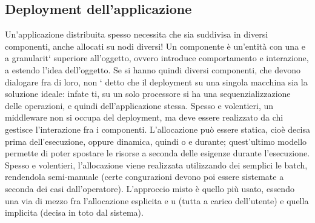 \subsection{Deployment dell'applicazione}

Un'applicazione distribuita spesso necessita che sia suddivisa in diversi componenti, anche allocati su nodi diversi! Un
componente è un'entità con una
e
a
granularit` superiore all'oggetto, ovvero introduce comportamento e interazione,
a
estendo l'idea dell'oggetto.
Se si hanno quindi diversi componenti, che devono dialogare fra di loro, non
` detto che il deployment su una singola macchina sia la soluzione ideale: infate
ti, su un solo processore si ha una sequenzializzazione delle operazioni, e quindi
dell'applicazione stessa.
Spesso e volentieri, un middleware non si occupa del deployment, ma deve
essere realizzato da chi gestisce l'interazione fra i componenti. L'allocazione
può essere statica, cioè decisa prima dell'esecuzione, oppure dinamica, quindi
o
e
durante; quest'ultimo modello permette di poter spostare le risorse a seconda
delle esigenze durante l'esecuzione. Spesso e volentieri, l'allocazione viene realizzata utilizzando dei semplici le
batch, rendendola semi-manuale (certe congurazioni devono poi essere sistemate a seconda dei casi dall'operatore).
L'approccio misto è quello più usato, essendo una via di mezzo fra l'allocazione esplicita
e
u
(tutta a carico dell'utente) e quella implicita (decisa in toto dal sistema).
